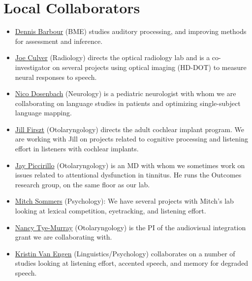 \documentclass[letterpaper,12pt,oneside]{memoir}
\begin{document}
\section{Local Collaborators}
\begin{itemize}

\item \href{https://engineering.wustl.edu/Profiles/Pages/Dennis-Barbour.aspx}{Dennis Barbour} (BME) studies auditory processing, and improving methods for assessment and inference.

\item \href{http://orl.wustl.edu/culver.html}{Joe Culver} (Radiology) directs the optical radiology lab and is a co-investigator on several projects using optical imaging (HD-DOT) to measure neural responses to speech.

\item \href{https://neuro.wustl.edu/about-us/physician-faculty-directory/nico-dosenbach-md/}{Nico Dosenbach} (Neurology) is a pediatric neurologist with whom we are collaborating on language studies in patients and optimizing single-subject language mapping.


\item \href{http://otocore.wustl.edu/firsztlab/Home.aspx}{Jill Firszt} (Otolaryngology) directs the adult cochlear implant program. We are working with Jill on projects related to cognitive processing and listening effort in listeners with cochlear implants.

\item \href{http://otooutcomes.wustl.edu}{Jay Piccirillo} (Otolaryngology) is an MD with whom we sometimes work on issues related to attentional dysfunction in tinnitus. He runs the Outcomes research group, on the same floor as our lab.

\item \href{http://psychweb.wustl.edu/sommers}{Mitch Sommers} (Psychology): We have several projects with Mitch's lab looking at lexical competition, eyetracking, and listening effort.

\item \href{http://oto.wustl.edu/About-Us/Faculty-Physicians/Nancy-Tye-Murray}{Nancy Tye-Murray} (Otolaryngology) is the PI of the audiovisual integration grant we are collaborating with.

\item \href{http://kristinvanengen.wordpress.com}{Kristin Van Engen} (Linguistics/Psychology) collaborates on a number of studies looking at listening effort, accented speech, and memory for degraded speech.

\end{itemize}
\end{document}
